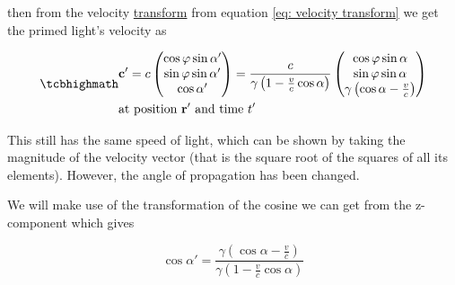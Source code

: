 then from the velocity \hyperlink{def-transform}{transform} from equation \eqref{eq: velocity transform} we get the primed light's velocity as


\begin{equation}
	\label{eq: velocity transform for light}
	\mhl{
		\begin{aligned}
			 & \mathbf{c}{'} =
			c
			\begin{pmatrix}
				\cos\varphi\sin\alpha{'} \\
				\sin\varphi\sin\alpha{'} \\
				\cos\alpha{'}            \\
			\end{pmatrix}
			=
			\dfrac{c}{{\gamma}\left(1-\frac{v}{c} \cos\alpha\right) }
			\begin{pmatrix}
				\cos\varphi\sin\alpha                          \\
				\sin\varphi\sin\alpha                          \\
				{\gamma} \left( \cos\alpha-\frac{v}{c} \right) \\
			\end{pmatrix}
			\\
			 & \text{at position $\mathbf{r}{'}$ and time ${t{'}}$ }
		\end{aligned}
	}
\end{equation}

This still has the same speed of light, which can be shown by taking the magnitude of the velocity vector (that is the square root of the squares of all its elements).
However, the angle of propagation has been changed.

We will make use of the transformation of the cosine we can get from the z-component which gives

\begin{equation}
	\label{eq: cosine transform}
	\cos\alpha{'} = \dfrac{{\gamma} \left( \cos\alpha-\frac{v}{c} \right)}{{\gamma}\left(1-\frac{v}{c} \cos\alpha\right) }
\end{equation}

